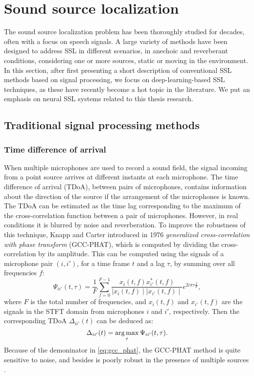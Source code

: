 \section{Sound source localization}
\label{sec:SSLliterature}

The sound source localization problem has been thoroughly studied for decades, often with a focus on speech signals. A large variety of methods have been designed to address SSL in different scenarios, in anechoic and reverberant conditions, considering one or more sources, static or moving in the environment. In this section, after first presenting a short description of conventional SSL methods based on signal processing, we focus on deep-learning-based SSL techniques, as these have recently become a hot topic in the literature. We put an emphasis on neural SSL systems related to this thesis research.

\subsection{Traditional signal processing methods}

\subsubsection{Time difference of arrival}

When multiple microphones are used to record a sound field, the signal incoming from a point source arrives at different instants at each microphone. The time difference of arrival (TDoA), between pairs of microphones, contains information about the direction of the source if the arrangement of the microphones is known. The TDoA can be estimated as the time lag corresponding to the maximum of the cross-correlation function between a pair of microphones. However, in real conditions it is blurred by noise and reverberation. To improve the robustness of this technique, Knapp and Carter \cite{knapp_generalized_1976} introduced in 1976 \textit{generalized cross-correlation with phase transform} (GCC-PHAT), which is computed by dividing the cross-correlation by its amplitude. This can be computed using the signals of a microphone pair $(i,i')$, for a time frame $t$ and a lag $\tau$, by summing over all frequencies $f$:
\begin{equation}
\label{eq:gcc_phat}
    \Psi_{ii'}(t,\tau) = \frac{1}{F} \sum_{f=0}^{F-1} \frac{x_i(t,f) x^{*}_{i'}(t,f)}{\mid x_i(t,f) \mid \mid x_{i'}(t,f) \mid} e^{2 i \pi \tau \frac{f}{F}},
\end{equation}
where $F$ is the total number of  frequencies, and $x_i(t,f)$ and $x_{i'}(t,f)$ are the signals in the STFT domain from microphones $i$ and $i'$, respectively.
Then the corresponding TDoA $\Delta_{ii'}(t)$ can be deduced as:
\begin{equation}
    \Delta_{ii'}(t) = \operatorname*{arg\,max}_{\tau} \Psi_{ii'}(t,\tau).
\end{equation}
Because of the demoninator in \eqref{eq:gcc_phat}, the GCC-PHAT method is quite sensitive to noise, and besides is poorly robust in the presence of multiple sources \cite{blandin_multi-source_2012}.

